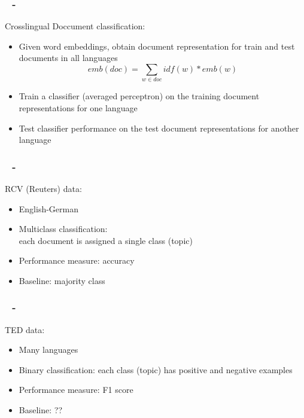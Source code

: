 \documentclass{beamer}
\newenvironment{dia}
{
\begin{frame}[fragile, environment=dia]
\frametitle{\insertsection
\ifx\insertsubsection\empty\else
      \,~-~\insertsubsection             %
   \fi}
}
{
\end{frame}
}
\begin{document}
\begin{dia}
Crosslingual Doccument classification:
\begin{itemize}
\item Given word embeddings, obtain document representation for train and test documents in all languages
\begin{equation*}
emb(doc)=\sum_{w\in doc} idf(w)*emb(w)
\end{equation*}
\item Train a classifier (averaged perceptron) on the training document representations for one language
\item Test classifier performance on the test document representations for another language
\end{itemize}
\end{dia}



\begin{dia}
RCV (Reuters) data:
\begin{itemize}
\item English-German
\item Multiclass classification: \\
each document is assigned a single class (topic)
\item Performance measure: accuracy
\item Baseline: majority class
\end{itemize}
\end{dia}


\begin{dia}
TED data:
\begin{itemize}
\item Many languages
\item Binary classification: each class (topic) has positive and negative examples
\item Performance measure: F1 score
\item Baseline: ??
\end{itemize}
\end{dia}
\end{document}
